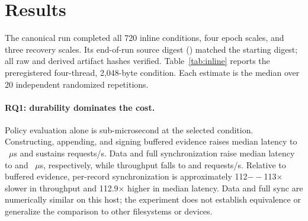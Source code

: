 \documentclass[10pt,twocolumn]{article}
\begin{document}
\section{Results}
The canonical run completed all 720 inline conditions, four epoch scales, and three recovery scales. Its end-of-run source digest (\texttt{\RGSourceDigestShort}) matched the starting digest; all raw and derived artifact hashes verified. Table~\ref{tab:inline} reports the preregistered four-thread, 2,048-byte condition. Each estimate is the median over 20 independent randomized repetitions.

\begin{table}[t]
\centering
\small
\caption{Inline component results at \RGThreads{} threads and \RGPromptBytes-byte prompts. Latency is in microseconds; throughput is requests/s.}
\label{tab:inline}
\end{table}

\paragraph{RQ1: durability dominates the cost.}
Policy evaluation alone is sub-microsecond at the selected condition. Constructing, appending, and signing buffered evidence raises median latency to \RGBufferedMedian~$\mu$s and sustains \RGBufferedThroughput{} requests/s. Data and full synchronization raise median latency to \RGDataMedian{} and \RGFullMedian~$\mu$s, respectively, while throughput falls to \RGDataThroughput{} and \RGFullThroughput{} requests/s. Relative to buffered evidence, per-record synchronization is approximately 112$--$113$\times$ slower in throughput and 112.9$\times$ higher in median latency. Data and full sync are numerically similar on this host; the experiment does not establish equivalence or generalize the comparison to other filesystems or devices.
\end{document}
